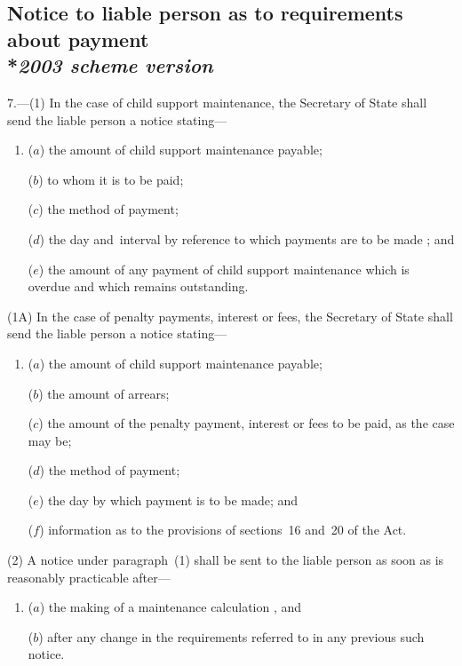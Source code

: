 \documentclass[12pt,a4paper]{article}
\begin{document}
\subsection[7. Notice to liable person as to requirements about payment --- \emph{2003 scheme version}]{Notice to liable person as to requirements about payment\\*\emph{2003 scheme version}}

7.—(1) 
In the case of child support maintenance,  %
the Secretary of State shall send the liable person a notice stating—
\begin{enumerate}\item[]
($a$) the amount of child support maintenance payable;

($b$) to whom it is to be paid;

($c$) the method of payment; 

($d$) the day and~interval by reference to which payments are to be made%
; and

($e$) the amount of any payment of child support maintenance which is overdue and which remains outstanding.
\end{enumerate}

(1A) In the case of penalty payments, interest or fees, the Secretary of State shall send the liable person a notice stating—
\begin{enumerate}\item[]
($a$) the amount of child support maintenance payable;

($b$) the amount of arrears;

($c$) the amount of the penalty payment, interest or fees to be paid, as the case may be;

($d$) the method of payment;

($e$) the day by which payment is to be made; and

($f$) information as to the provisions of sections~16 and~20 of the Act.
\end{enumerate}

(2) A notice under paragraph~(1) shall be sent to the liable person as soon as is reasonably practicable after—
\begin{enumerate}\item[]
($a$) the making of a maintenance 
calculation%
, and

($b$) after any change in the requirements referred to in any previous such notice.
\end{enumerate}
\end{document}
